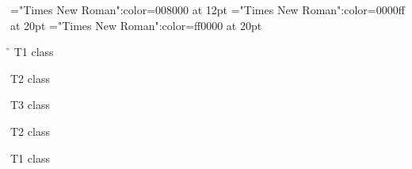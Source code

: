 \font\tctbta="Times New Roman":color=008000 at 12pt
\font\tbta="Times New Roman":color=0000ff at 20pt
\font\ta="Times New Roman":color=ff0000 at 20pt
 \r\n
\ta T1 class 

\tbta T2 class 

\tctbta T3 class 

\tbta T2 class 

\ta T1 class 


\bye
